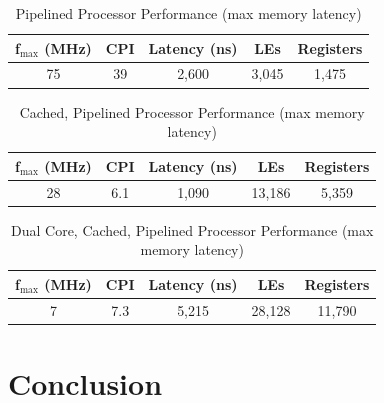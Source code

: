 \documentclass[12pt]{article}
\begin{document}
\begin{table}
\begin{center}

  \caption{Pipelined Processor Performance (max memory latency)}
  \begin{tabular}{| c | c | c | c | c |}
  \hline
  f$_{\textrm{max}}$ (MHz) & CPI & Latency (ns) & LEs & Registers \\ \hline
 75 & 39 & 2,600 &  3,045 & 1,475 \\ \hline
  \end{tabular}
  \end{center}

  \label{tab:perf_pipe}
\end{table}

\begin{table}
\begin{center}

  \caption{Cached, Pipelined Processor Performance (max memory latency)}
  \begin{tabular}{| c | c | c | c | c |}
  \hline
  f$_{\textrm{max}}$ (MHz) & CPI & Latency (ns) & LEs & Registers \\ \hline
 28 & 6.1 & 1,090 & 13,186 & 5,359 \\ \hline
  \end{tabular}
  \end{center}

  \label{tab:perf_cache}
\end{table}



\begin{table}
\begin{center}

  \caption{Dual Core, Cached, Pipelined Processor Performance (max memory latency)}
  \begin{tabular}{| c | c | c | c | c |}
  \hline
  f$_{\textrm{max}}$ (MHz) & CPI & Latency (ns) & LEs & Registers \\ \hline
 7 & 7.3 & 5,215 & 28,128 & 11,790 \\ \hline
  \end{tabular}
  \end{center}

  \label{tab:perf_dual}
\end{table}



  \section{Conclusion}
\end{document}
